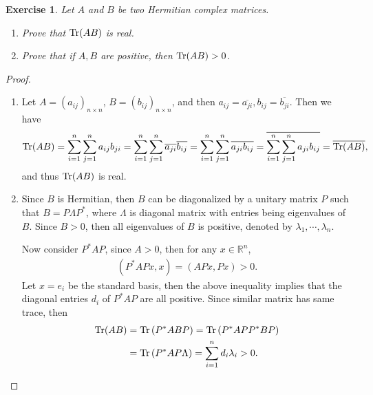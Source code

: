 \documentclass[11pt]{article}
\newtheorem{exercise}{Exercise}[section]
\theoremstyle{definition}
\numberwithin{equation}{subsection}
\begin{document}
\begin{exercise}\label{Aug_2017_2}
Let $A$ and $B$ be two Hermitian complex matrices.
\begin{enumerate}[label=(\alph*)]
    \item Prove that $\Tr(AB)$ is real. 
    
    \item Prove that if $A, B$ are positive, then $\Tr(AB) > 0$.
\end{enumerate}
\end{exercise}
\begin{proof}
~\begin{enumerate}[label=(\alph*)]
    \item Let $A = \left(a_{ij}\right)_{n \times n}$, $B = \left(b_{ij}\right)_{n \times n}$, and then $a_{ij} = \overline{a_{ji}}, b_{ij} = \overline{b_{ji}}$. Then we have
    \begin{align*}
        \Tr(AB) = \sum^n_{i=1} \sum^n_{j=1} a_{ij} b_{ji} = \sum^n_{i=1} \sum^n_{j=1} \overline{a_{ji}} \overline{b_{ij}} =  \sum^n_{i=1} \sum^n_{j=1} \overline{a_{ji} b_{ij}} = \overline{\sum^n_{i=1} \sum^n_{j=1} a_{ji} b_{ij}} = \overline{\Tr(AB)},
    \end{align*}
    and thus $\Tr(AB)$ is real. 
    
    \item Since $B$ is Hermitian, then $B$ can be diagonalized by a unitary matrix $P$ such that $B = P \Lambda P^*$, where $\Lambda$ is diagonal matrix with entries being eigenvalues of $B$. Since $B > 0$, then all eigenvalues of $B$ is positive, denoted by $\lambda_1, \cdots, \lambda_n$.
    
    Now consider $P^*AP$, since $A > 0$, then for any $x \in \mathbb{R}^n$,
    \begin{align*}
        \left(P^*APx, x\right) = \left(APx, Px\right) > 0.
    \end{align*}
    Let $x = e_i$ be the standard basis, then the above inequality implies that the diagonal entries $d_i$ of $P^*AP$ are all positive. Since similar matrix has same trace, then
    \begin{align*}
        \Tr(AB) & = \Tr\left(P^*ABP\right) = \Tr \left(P^*APP^*BP\right) \\
        & = \Tr \left(P^*AP \Lambda\right) = \sum^n_{i=1} d_i \lambda_i > 0.
    \end{align*}
\end{enumerate}
\end{proof}
\end{document}

